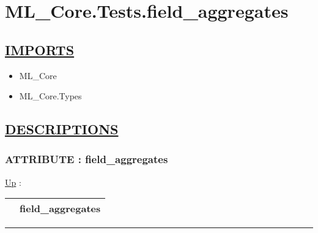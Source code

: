 \chapter*{ML\_Core.Tests.field\_aggregates}
\hypertarget{ecldoc:toc:ML_Core.Tests.field_aggregates}{}

\section*{\underline{IMPORTS}}
\begin{itemize}
\item ML\_Core
\item ML\_Core.Types
\end{itemize}

\section*{\underline{DESCRIPTIONS}}
\subsection*{ATTRIBUTE : field\_aggregates}
\hypertarget{ecldoc:ml_core.tests.field_aggregates}{}
\hyperlink{ecldoc:toc:ML_Core/Tests}{Up} :

{\renewcommand{\arraystretch}{1.5}
\begin{tabularx}{\textwidth}{|>{\raggedright\arraybackslash}l|X|}
\hline
\hspace{0pt} & field\_aggregates \\
\hline
\end{tabularx}
}

\par


\rule{\linewidth}{0.5pt}
